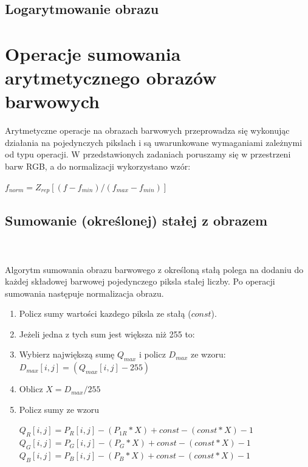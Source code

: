 \documentclass[final,a4paper,openany,12pt]{mwbk}
\begin{document}
\section {Logarytmowanie obrazu}

\chapter{Operacje sumowania arytmetycznego obrazów barwowych}

Arytmetyczne operacje na obrazach barwowych przeprowadza się wykonując działania na pojedynczych pikslach i są uwarunkowane wymaganiami zależnymi od typu operacji. 
W przedstawionych zadaniach poruszamy się w przestrzeni barw RGB, a do normalizacji wykorzystano wzór:

	\begin{center}
		$ f_{norm} = Z_{rep}[(f - f_{min}) / (f_{max} - f_{min})] $
	\end{center}


\section{Sumowanie (określonej) stałej z obrazem}
\hfill
\\\\
\indent
Algorytm sumowania obrazu barwowego z określoną stałą polega na dodaniu do każdej składowej barwowej pojedynczego piksla stałej liczby.
Po operacji sumowania następuje normalizacja obrazu.

	\begin{enumerate}	
		\item Policz sumy wartości kazdego piksla ze stałą ($const$).
		\item Jeżeli jedna z tych sum jest większa niż 255 to:
		\item Wybierz największą sumę  $Q_{max}$ i policz $D_{max}$ ze wzoru: $D_{max}[i,j] = (Q_{max}[i,j] - 255)$ 
		\item Oblicz $X = D_{max} / 255$
		\item Policz sumy ze wzoru
		\begin{center}$Q_{R}[i,j] = P_{R}[i,j] - (P_{1R} * X)+ const - (const * X) -1$ \\
			$Q_{G}[i,j] = P_{G}[i,j] - (P_{G} * X)+ const - (const * X) -1$ \\
			$Q_{B}[i,j] = P_{B}[i,j] - (P_{B} * X)+ const - (const * X) -1$
		\end{center}
	\end{enumerate}
\end{document}
